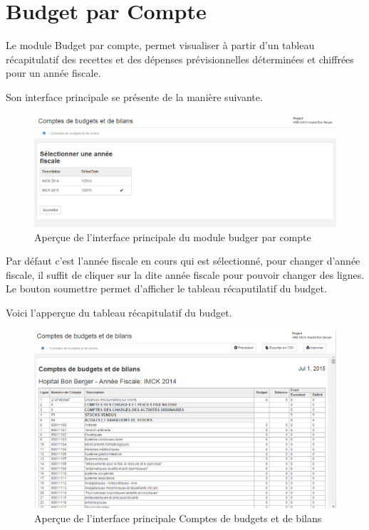\documentclass[12pt,a4paper]{report}
\begin{document}
\section{Budget par Compte}
Le module Budget par compte, permet visualiser à partir d'un tableau récapitulatif des recettes et des dépenses prévisionnelles déterminées et chiffrées pour un année fiscale.

Son interface principale se présente de la manière suivante.

\begin{figure}[h]
\begin{center}
\includegraphics[width=12cm]{pic/BudgetParCompte.png}
\end{center}
\caption{Aperçue de l'interface principale du module budger par compte}
\label{Aperçue de l'interface principale du module budger par compte}
\end{figure}

Par défaut c'est l'année fiscale en cours qui est sélectionné, pour changer d'année fiscale, il suffit de cliquer sur la dite année fiscale pour pouvoir changer des lignes. Le bouton soumettre permet d'afficher le tableau récaputilatif du budget.

\newpage
Voici l'apperçue du tableau récapitulatif du budget.

\begin{figure}[h]
\begin{center}
\includegraphics[width=12cm]{pic/CompBudget.png}
\end{center}
\caption{Aperçue de l'interface principale Comptes de budgets et de bilans}
\label{Aperçue de l'interface principale Comptes de budgets et de bilans}
\end{figure}
\end{document}

